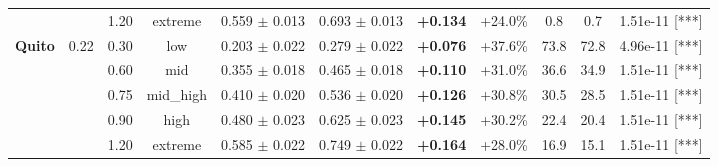 \begin{table}[t]
{\begin{tabular}{llccccccccl}
   &  & 1.20 & extreme & 0.559 $\pm$ 0.013 & 0.693 $\pm$ 0.013 & \textbf{+0.134} & +24.0\% & 0.8 & 0.7 & 1.51e-11 [***] \\
\cmidrule(lr){1-11}
  \multirow{5}{*}{\textbf{Quito}} & \multirow{5}{*}{0.22} & 0.30 & low & 0.203 $\pm$ 0.022 & 0.279 $\pm$ 0.022 & \textbf{+0.076} & +37.6\% & 73.8 & 72.8 & 4.96e-11 [***] \\
   &  & 0.60 & mid & 0.355 $\pm$ 0.018 & 0.465 $\pm$ 0.018 & \textbf{+0.110} & +31.0\% & 36.6 & 34.9 & 1.51e-11 [***] \\
   &  & 0.75 & mid\_high & 0.410 $\pm$ 0.020 & 0.536 $\pm$ 0.020 & \textbf{+0.126} & +30.8\% & 30.5 & 28.5 & 1.51e-11 [***] \\
   &  & 0.90 & high & 0.480 $\pm$ 0.023 & 0.625 $\pm$ 0.023 & \textbf{+0.145} & +30.2\% & 22.4 & 20.4 & 1.51e-11 [***] \\
   &  & 1.20 & extreme & 0.585 $\pm$ 0.022 & 0.749 $\pm$ 0.022 & \textbf{+0.164} & +28.0\% & 16.9 & 15.1 & 1.51e-11 [***] \\
\bottomrule
\end{tabular}%
}
\end{table}